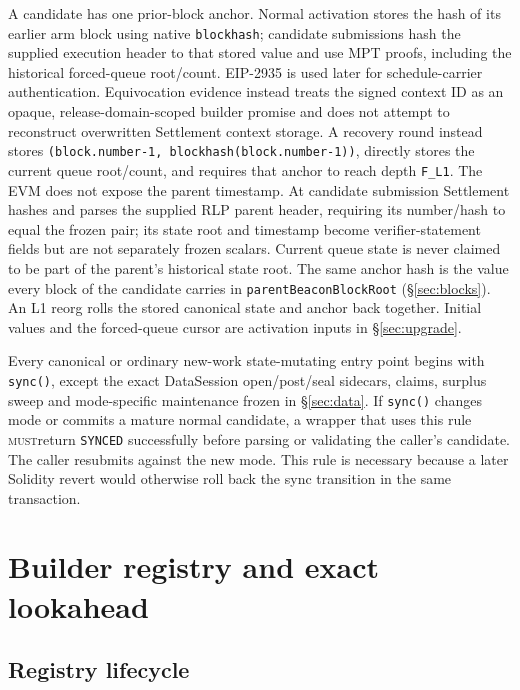 \documentclass[a4paper,11pt]{article}
\newcommand{\code}[1]{\nolinkurl{#1}}
\newcommand{\must}{\textsc{must}}
\begin{document}
A candidate has one prior-block anchor.  Normal activation stores the hash of
its earlier arm block using native \code{blockhash}; candidate submissions hash
the supplied execution header to that stored value and use MPT proofs,
including the historical forced-queue root/count.  EIP-2935 is used later for
schedule-carrier authentication.  Equivocation evidence instead treats the
signed context ID as an opaque, release-domain-scoped builder promise and does
not attempt to reconstruct overwritten Settlement context storage.  A recovery round instead stores
\code{(block.number-1, blockhash(block.number-1))}, directly stores the current
queue root/count, and requires that anchor to reach depth \code{F_L1}.  The EVM
does not expose the parent timestamp.  At candidate submission Settlement
hashes and parses the supplied RLP parent header, requiring its number/hash to
equal the frozen pair; its state root and timestamp become verifier-statement
fields but are not separately frozen scalars.  Current queue state is never
claimed to be part of the parent's historical state root.  The same anchor
hash is the value every block of the candidate carries in
\code{parentBeaconBlockRoot} (\S\ref{sec:blocks}).  An L1 reorg rolls the
stored canonical state and anchor back together.  Initial values and the
forced-queue cursor are activation inputs in \S\ref{sec:upgrade}.

Every canonical or ordinary new-work state-mutating entry point begins with
\code{sync()}, except the exact DataSession open/post/seal sidecars, claims,
surplus sweep and mode-specific maintenance frozen in \S\ref{sec:data}.  If
\code{sync()} changes mode or commits a mature normal candidate, a wrapper that
uses this rule
\must return \code{SYNCED} successfully before parsing or validating the
caller's candidate.  The caller resubmits against the new mode.  This rule is
necessary because a later Solidity revert would otherwise roll back the sync
transition in the same transaction.

\section{Builder registry and exact lookahead}\label{sec:schedule}

\subsection{Registry lifecycle}
\end{document}
